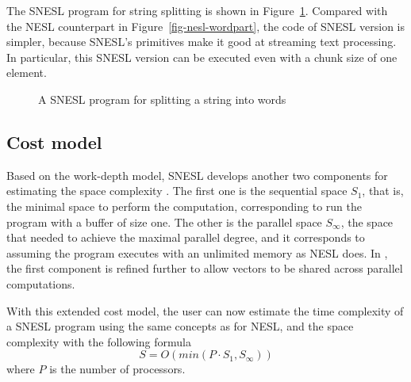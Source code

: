 The SNESL program for string splitting is shown in Figure~\ref{fig-snesl-wordpart}. 
Compared with the NESL counterpart in Figure~\ref{fig-nesl-wordpart}, the code of SNESL version is simpler, because SNESL's primitives make it good at streaming text processing. 
In particular, this SNESL version can be executed even with a chunk size of one element.
 
\begin{figure}[H]
	 
	\caption{{A SNESL program for splitting a string into words \label{fig-snesl-wordpart}}}
\end{figure}


\subsection{Cost model}

Based on the work-depth model, SNESL develops another two components for estimating the space complexity \cite{MadFil13}. 
The first one is the sequential space $S_1$, that is, the minimal space to perform the computation, corresponding to run the program with a buffer of size one. 
The other is the parallel space $S_\infty$, the space that needed to achieve the maximal parallel degree, and it corresponds to assuming the program executes with an unlimited memory as NESL does.
In \cite{Fphd}, the first component is refined further to allow vectors to be shared across parallel computations.

With this extended cost model, the user can now estimate the time complexity of a SNESL program using the same concepts as for NESL, and the space complexity with the following formula
$$ S = O(min(P \cdot S_1, S_\infty)) $$
where $P$ is the number of processors.
	
